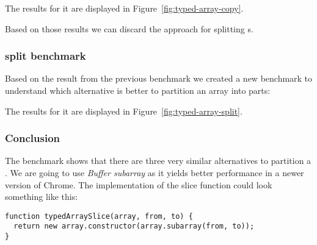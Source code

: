 The results for it are displayed in Figure~\ref{fig:typed-array-copy}.

Based on those results we can discard the  approach for splitting \ttarray{}s.


\subsubsection{\ttarray{} split benchmark}
Based on the result from the previous benchmark we created a new benchmark to understand which alternative is better to partition an array into parts:

The results for it are displayed in Figure~\ref{fig:typed-array-split}.

\subsubsection{Conclusion}
The benchmark shows that there are three very similar alternatives to partition a \ttarray{}. We are going to use \textit{Buffer subarray} as it yields better performance in a newer version of Chrome. The implementation of the slice function could look something like this:
\begin{lstlisting}[caption=Possible approach to copy a slice of a \ttarray{}]
function typedArraySlice(array, from, to) {
  return new array.constructor(array.subarray(from, to));
}
\end{lstlisting}

\pagebreak